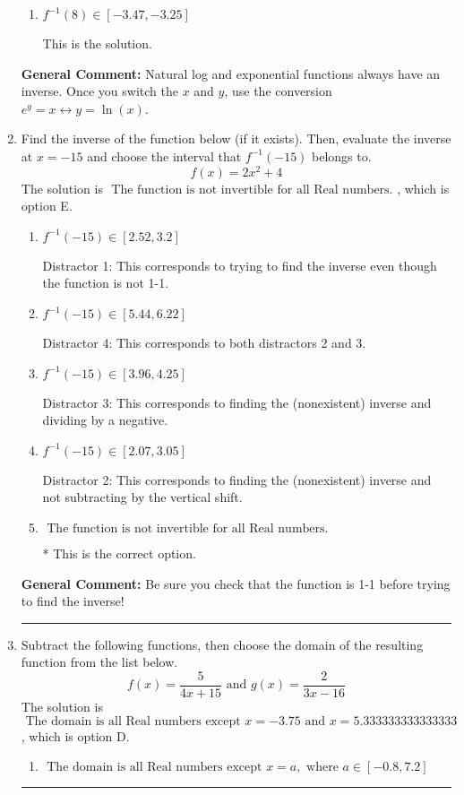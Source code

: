\documentclass{extbook}[14pt]
\newcommand{\litem}[1]{\item #1

\rule{\textwidth}{0.4pt}}
\begin{document}
\begin{enumerate}
{\begin{enumerate}[label=\Alph*.]
 This solution corresponds to distractor 3.
\item \( f^{-1}(8) \in [-3.47, -3.25] \)

 This is the solution.
\end{enumerate}

\textbf{General Comment:} Natural log and exponential functions always have an inverse. Once you switch the $x$ and $y$, use the conversion $ e^y = x \leftrightarrow y=\ln(x)$.
}
\litem{
Find the inverse of the function below (if it exists). Then, evaluate the inverse at $x = -15$ and choose the interval that $f^{-1}(-15)$ belongs to.
\[ f(x) = 2 x^2 + 4 \]The solution is \( \text{ The function is not invertible for all Real numbers. } \), which is option E.\begin{enumerate}[label=\Alph*.]
\item \( f^{-1}(-15) \in [2.52, 3.2] \)

 Distractor 1: This corresponds to trying to find the inverse even though the function is not 1-1. 
\item \( f^{-1}(-15) \in [5.44, 6.22] \)

 Distractor 4: This corresponds to both distractors 2 and 3.
\item \( f^{-1}(-15) \in [3.96, 4.25] \)

 Distractor 3: This corresponds to finding the (nonexistent) inverse and dividing by a negative.
\item \( f^{-1}(-15) \in [2.07, 3.05] \)

 Distractor 2: This corresponds to finding the (nonexistent) inverse and not subtracting by the vertical shift.
\item \( \text{ The function is not invertible for all Real numbers. } \)

* This is the correct option.
\end{enumerate}

\textbf{General Comment:} Be sure you check that the function is 1-1 before trying to find the inverse!
}
\litem{
Subtract the following functions, then choose the domain of the resulting function from the list below.
\[ f(x) = \frac{5}{4x+15} \text{ and } g(x) = \frac{2}{3x-16} \]The solution is \( \text{ The domain is all Real numbers except } x = -3.75 \text{ and } x = 5.333333333333333 \), which is option D.\begin{enumerate}[label=\Alph*.]
\item \( \text{ The domain is all Real numbers except } x = a, \text{ where } a \in [-0.8, 7.2] \)



\end{enumerate}}
\end{enumerate}
\end{document}
